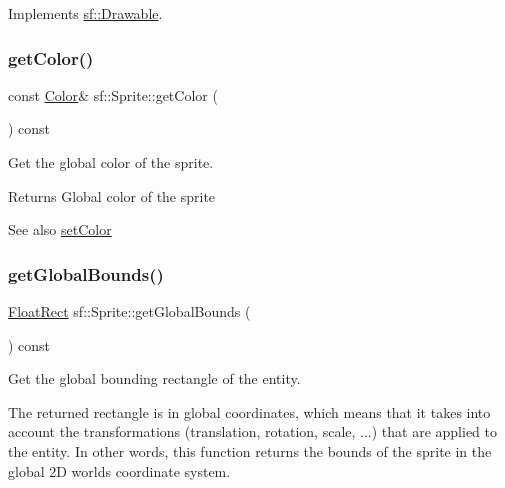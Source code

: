 Implements \mbox{\hyperlink{classsf_1_1_drawable_a90d2c88bba9b035a0844eccb380ef631}{sf\+::\+Drawable}}.

\mbox{\label{classsf_1_1_sprite_ac5f419f37b4e38f7a94186e3a3e303e1}} 
\subsubsection{\texorpdfstring{getColor()}{getColor()}}
{\footnotesize\ttfamily const \mbox{\hyperlink{classsf_1_1_color}{Color}}\& sf\+::\+Sprite\+::get\+Color (\begin{DoxyParamCaption}{ }\end{DoxyParamCaption}) const}



Get the global color of the sprite. 

\begin{DoxyReturn}{Returns}
Global color of the sprite
\end{DoxyReturn}
\begin{DoxySeeAlso}{See also}
\mbox{\hyperlink{classsf_1_1_sprite_a14def44da6437bfea20c4df5e71aba4c}{set\+Color}} \begin{DoxyVerb}\end{DoxyVerb}
 
\end{DoxySeeAlso}
\mbox{\label{classsf_1_1_sprite_aa795483096b90745b2e799532963e271}} 
\subsubsection{\texorpdfstring{getGlobalBounds()}{getGlobalBounds()}}
{\footnotesize\ttfamily \mbox{\hyperlink{classsf_1_1_rect}{Float\+Rect}} sf\+::\+Sprite\+::get\+Global\+Bounds (\begin{DoxyParamCaption}{ }\end{DoxyParamCaption}) const}



Get the global bounding rectangle of the entity. 

The returned rectangle is in global coordinates, which means that it takes into account the transformations (translation, rotation, scale, ...) that are applied to the entity. In other words, this function returns the bounds of the sprite in the global 2D world\textquotesingle{}s coordinate system.

